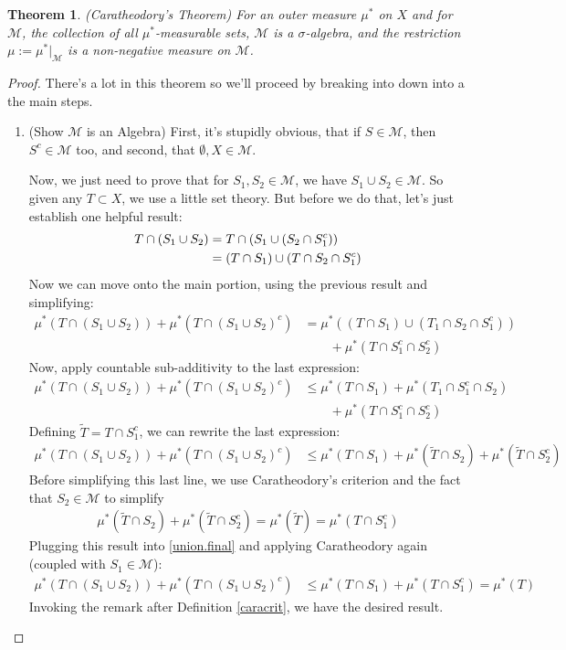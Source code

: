 \documentclass[12pt]{article}
\theoremstyle{plain}
\newtheorem{thm}{Theorem}[subsection]
\theoremstyle{definition}
\theoremstyle{remark}
\begin{document}
\begin{thm}
\emph{(Caratheodory's Theorem)} For an outer measure $\mu^*$ on $X$ and for $\mathscr{M}$, the collection of all $\mu^*$-measurable sets, $\mathscr{M}$ is a $\sigma$-algebra, and the restriction $\mu:=\mu^*|_\mathscr{M}$ is a non-negative measure on $\mathscr{M}$.
\end{thm}
\begin{proof}
There's a lot in this theorem so we'll proceed by breaking into down into a the main steps.

\begin{enumerate}
\item (Show $\mathscr{M}$ is an Algebra) First, it's stupidly obvious, that if $S\in\mathscr{M}$, then $S^c\in\mathscr{M}$ too, and second, that $\emptyset, X\in\mathscr{M}$. 

Now, we just need to prove that for $S_1,S_2\in\mathscr{M}$, we have $S_1\cup S_2\in\mathscr{M}$. So given any $T\subset X$, we use a little set theory. But before we do that, let's just establish one helpful result:
\begin{align}
    \label{outmeasmod}
    T\cap (S_1\cup S_2) &=  
    T\cap (S_1\cup (S_2\cap S_1^c)) \notag \\
    &= (T\cap S_1)\cup (T\cap S_2\cap S_1^c) 
\end{align}
Now we can move onto the main portion, using the previous result and simplifying:
\begin{align*}
    \mu^*(T\cap(S_1\cup S_2)) +
    \mu^*(T\cap(S_1\cup S_2)^c) &=
    \mu^*((T\cap S_1)\cup (T_1 \cap S_2\cap S_1^c)) \\
    &\qquad+\mu^*(T\cap S_1^c\cap S_2^c) 
\end{align*}
Now, apply countable sub-additivity to the last expression:
\begin{align*}
    \mu^*(T\cap(S_1\cup S_2)) +
    \mu^*(T\cap(S_1\cup S_2)^c) 
    &\leq\mu^*(T\cap S_1) + \mu^*(T_1\cap S_1^c \cap S_2)\\
    &\qquad+\mu^*(T\cap S_1^c\cap S_2^c) 
\end{align*}
Defining $\tilde{T}=T\cap S_1^c$, we can rewrite the last expression:
\begin{align}
    \label{union.final}
    \mu^*(T\cap(S_1\cup S_2)) +
    \mu^*(T\cap(S_1\cup S_2)^c) 
    &\leq\mu^*(T\cap S_1) + \mu^*(\tilde{T} \cap S_2)
    +\mu^*(\tilde{T}\cap S_2^c) 
\end{align}
Before simplifying this last line, we use Caratheodory's criterion and the fact that $S_2\in\mathscr{M}$ to simplify 
\begin{align*}
    \mu^*(\tilde{T} \cap S_2)
    +\mu^*(\tilde{T}\cap S_2^c) =
    \mu^*(\tilde{T}) = \mu^*(T\cap S_1^c)
\end{align*}
Plugging this result into \ref{union.final} and applying Caratheodory again (coupled with $S_1\in\mathscr{M}$):
\begin{align*}
    \mu^*(T\cap(S_1\cup S_2)) +
    \mu^*(T\cap(S_1\cup S_2)^c) 
    &\leq\mu^*(T\cap S_1) 
    + \mu^*(T\cap S_1^c) 
    =\mu^*(T)
\end{align*}
Invoking the remark after Definition \ref{caracrit}, we have the desired result.


\end{enumerate}
\end{proof}
\end{document}
